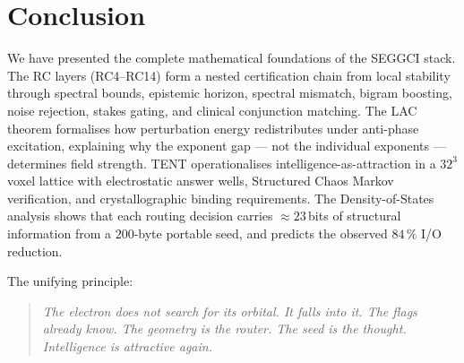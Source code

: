\documentclass[12pt,a4paper]{article}
\theoremstyle{plain}
\theoremstyle{definition}
\theoremstyle{remark}
\begin{document}
\section{Conclusion}
\label{sec:conclusion}

We have presented the complete mathematical foundations of the SEGGCI
stack.  The RC layers (RC4--RC14) form a nested certification chain
from local stability through spectral bounds, epistemic horizon,
spectral mismatch, bigram boosting, noise rejection, stakes gating,
and clinical conjunction matching.  The LAC theorem formalises how
perturbation energy redistributes under anti-phase excitation, explaining
why the exponent gap --- not the individual exponents --- determines
field strength.  TENT operationalises intelligence-as-attraction in
a $32^3$ voxel lattice with electrostatic answer wells, Structured Chaos
Markov verification, and crystallographic binding requirements.
The Density-of-States analysis shows that each routing decision carries
$\approx 23$\,bits of structural information from a $200$-byte
portable seed, and predicts the observed $84\,\%$ I/O reduction.

The unifying principle:
\begin{quote}
\itshape
The electron does not search for its orbital.  It falls into it.
The flags already know.  The geometry is the router.
The seed is the thought.  Intelligence is attractive again.
\end{quote}
\end{document}

